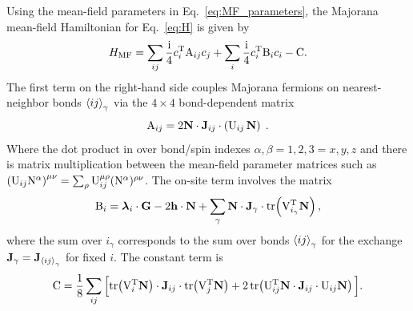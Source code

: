 Using the mean-field parameters in Eq.~\eqref{eq:MF_parameters}, the Majorana mean-field Hamiltonian for Eq.~\eqref{eq:H} is given by
\begin{equation}
    H_{\mathrm{MF}}=\sum_{ {ij} }  \frac{\mathrm{i}}{4} c_i^{{\mathrm{T}}}   \mathrm{A}_{ij}  c_j +\sum_i  \frac{\mathrm{i}}{4} c_i^{{\mathrm{T}}}   \mathrm{B}_{i}  c_i-\mathrm{C} . \label{eq:HMF}
\end{equation}
The  first  term on the right-hand side couples Majorana fermions on nearest-neighbor  bonds $\braket{ij}_\gamma$ via the $4\times 4$ bond-dependent matrix
\begin{equation}
    \mathrm{A}_{ij} =
    2    \mathbf{N} \cdot \mathbf{J}_{ij} \cdot \left( \mathrm{U}_{ij} \, \mathbf{N} \right) \;
    .  \label{eq:A}
\end{equation}
Where the dot product in over bond/spin indexes $\alpha,\beta=1,2,3=x,y,z$ and there is matrix multiplication between the mean-field parameter matrices such as $\left( \mathrm{U}_{ij} \mathrm{N}^\alpha  \right)^{\mu\nu}= \sum_{\rho} \mathrm{U}_{ij}^{\mu\rho}(\mathrm{N}^\alpha )^{\rho \nu}  $.
The on-site term involves the matrix
\begin{equation}
    \mathrm{B}_{i}= \bm{\lambda}_i \cdot   \mathbf{G} -    2 \mathbf{h} \cdot  \mathbf{N}  +
    \sum_{\gamma}
    \mathbf{N} \cdot \mathbf{J}_{\gamma}
    \cdot \mathrm{tr}\!\left( \mathrm{V}_{i_\gamma}^{\mathrm{T}} \mathbf{N} \right)
    , \label{eq:B}
\end{equation}
where the sum over $i_\gamma$ corresponds to the sum over bonds $\braket{ij}_\gamma$ for the exchange $\mathbf{J}_{\gamma}=\mathbf{J}_{\braket{ij}_\gamma}$ for fixed $i$.
The constant term is
\begin{equation}
\begin{split}
       \mathrm{C} =
       \frac{1}{8}\sum_{ij}   \Big[  \mathrm{tr}\!\left( \mathrm{V}_{i}^{\mathrm{T}} \mathbf{N} \right) \cdot \mathbf{J}_{ij}  \cdot \mathrm{tr}\!\left( \mathrm{V}_{j}^{\mathrm{T}} \mathbf{N} \right)       + 2 \,  \mathrm{tr}\!\left( \mathrm{U}_{ij}^{\mathrm{T}} \mathbf{N}   \cdot \mathbf{J}_{ij}  \cdot \mathrm{U}_{ij} \mathbf{N} \right)   \Big]
    .  \label{eq:C}
\end{split}
\end{equation}

